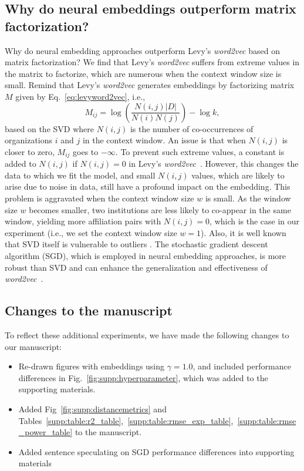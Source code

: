 \documentclass[12pt,a4paper]{article}
\begin{document}
\subsection{Why do neural embeddings outperform matrix factorization?}
Why do neural embedding approaches outperform Levy's {\it word2vec} based on matrix factorization?
We find that Levy's {\it word2vec} suffers from extreme values in the matrix to factorize, which are numerous when the context window size is small.
Remind that Levy's {\it word2vec} generates embeddings by factorizing matrix $M$ given by Eq.~\eqref{eq:levyword2vec}, i.e.,
\begin{equation}
	M_{ij} = \log\left(\frac{N(i,j) |D|}{N(i) N(j)}\right) - \log k, \nonumber
\end{equation}
based on the SVD where $N(i,j)$ is the number of co-occurrences of organizations $i$ and $j$ in the context window.
An issue is that when $N(i,j)$ is closer to zero, $M_{ij}$ goes to $-\infty$.
To prevent such extreme values, a constant is added to $N(i,j)$ if $N(i,j)=0$ in Levy's {\it word2vec}~\autocite{levy2014neural, Qui2018}.
However, this changes the data to which we fit the model, and small $N(i,j)$ values, which are likely to arise due to noise in data, still have a profound impact on the embedding.
This problem is aggravated when the context window size $w$ is small.
As the window size $w$ becomes smaller, two institutions are less likely to co-appear in the same window, yielding more affiliation pairs with $N(i,j)=0$, which is the case in our experiment (i.e., we set the context window size $w=1$).
Also, it is well known that SVD itself is vulnerable to outliers \autocite{xu2012robust, huber1981robust, xu1995robust, chandrasekaran2011rank, candes2011robust}.
The stochastic gradient descent algorithm (SGD), which is employed in neural embedding approaches, is more robust than SVD and can enhance the generalization and effectiveness of {\it word2vec}~\autocite{ma2018power, smith2020generalization, zhang2019algorithmic}.


\subsection{Changes to the manuscript}
To reflect these additional experiments, we have made the following changes to our manuscript:
\begin{itemize}
	\item Re-drawn figures with embeddings using $\gamma = 1.0$, and included performance differences in Fig.~\ref{fig:supp:hyperparameter}, which was added to the supporting materials.
	\item Added Fig~\ref{fig:supp:distancemetrics} and Tables~\ref{supp:table:r2_table},~\ref{supp:table:rmse_exp_table},~\ref{supp:table:rmse_power_table} to the manuscript.
	\item Added sentence speculating on SGD performance differences into supporting materials
\end{itemize}
\end{document}
